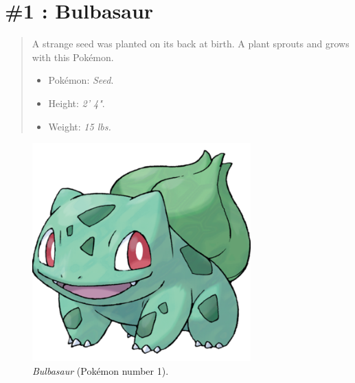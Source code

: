 \clearpage
\newpage
\section{\#1 : Bulbasaur}

\begin{quote}
    \begin{large}
        A strange seed was planted on its back at birth. A plant sprouts and grows with this Pokémon.
    \end{large}

    \begin{itemize}
        \item Pokémon: \emph{Seed}.
        \item Height: \emph{2' 4"}.
        \item Weight: \emph{15 lbs.}
        \end{itemize}
\end{quote}


\vfill{}
\begin{figure}[!h]
    \centering
    \includegraphics[width=0.75\textwidth]{icons/1.png}
    \caption{\emph{Bulbasaur} (Pokémon number 1).}
\end{figure}

